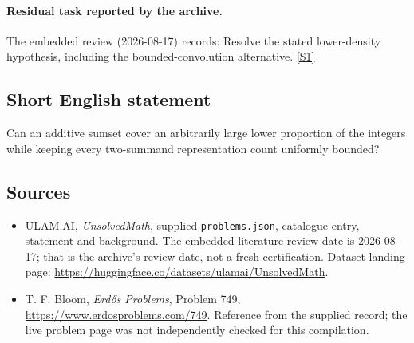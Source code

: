 \documentclass[11pt,a4paper]{article}
\newcommand{\sref}[2]{\hyperlink{source:#1:#2}{[S#2]}}
\begin{document}
\paragraph{Residual task reported by the archive.}

The embedded review (2026-08-17) records: Resolve the stated lower-density hypothesis, including the bounded-convolution alternative. \sref{statement}{1}

\subsection{Short English statement}

Can an additive sumset cover an arbitrarily large lower proportion of the integers while keeping every two-summand representation count uniformly bounded?

\subsection{Sources}

{\small

\begin{itemize}

\item[\hypertarget{source:statement:1}{S1}] ULAM.AI, \emph{UnsolvedMath}, supplied \texttt{problems.json}, catalogue entry, statement and background. The embedded literature-review date is 2026-08-17; that is the archive’s review date, not a fresh certification. Dataset landing page: \url{https://huggingface.co/datasets/ulamai/UnsolvedMath}.

\item[\hypertarget{source:statement:2}{S2}] T. F. Bloom, \emph{Erdős Problems}, Problem 749, \url{https://www.erdosproblems.com/749}. Reference from the supplied record; the live problem page was not independently checked for this compilation.

\end{itemize}

}

\label{end:statement}
\end{document}
